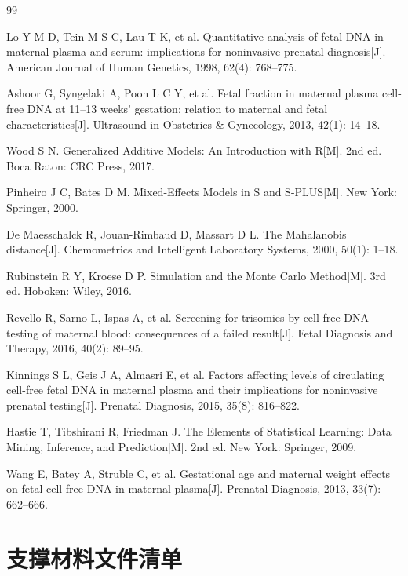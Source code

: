 \documentclass[withoutpreface]{cumcmthesis}
\begin{document}
\begin{thebibliography}{99}

Lo Y M D, Tein M S C, Lau T K, et al. Quantitative analysis of fetal DNA in maternal plasma and serum: implications for noninvasive prenatal diagnosis[J]. American Journal of Human Genetics, 1998, 62(4): 768--775.

Ashoor G, Syngelaki A, Poon L C Y, et al. Fetal fraction in maternal plasma cell-free DNA at 11--13 weeks' gestation: relation to maternal and fetal characteristics[J]. Ultrasound in Obstetrics \& Gynecology, 2013, 42(1): 14--18.

Wood S N. Generalized Additive Models: An Introduction with R[M]. 2nd ed. Boca Raton: CRC Press, 2017.

Pinheiro J C, Bates D M. Mixed-Effects Models in S and S-PLUS[M]. New York: Springer, 2000.

De Maesschalck R, Jouan-Rimbaud D, Massart D L. The Mahalanobis distance[J]. Chemometrics and Intelligent Laboratory Systems, 2000, 50(1): 1--18.

Rubinstein R Y, Kroese D P. Simulation and the Monte Carlo Method[M]. 3rd ed. Hoboken: Wiley, 2016.

Revello R, Sarno L, Ispas A, et al. Screening for trisomies by cell-free DNA testing of maternal blood: consequences of a failed result[J]. Fetal Diagnosis and Therapy, 2016, 40(2): 89--95.

Kinnings S L, Geis J A, Almasri E, et al. Factors affecting levels of circulating cell-free fetal DNA in maternal plasma and their implications for noninvasive prenatal testing[J]. Prenatal Diagnosis, 2015, 35(8): 816--822.

Hastie T, Tibshirani R, Friedman J. The Elements of Statistical Learning: Data Mining, Inference, and Prediction[M]. 2nd ed. New York: Springer, 2009.

Wang E, Batey A, Struble C, et al. Gestational age and maternal weight effects on fetal cell-free DNA in maternal plasma[J]. Prenatal Diagnosis, 2013, 33(7): 662--666.

\end{thebibliography}

\newpage
\appendix
\section{支撑材料文件清单}
\end{document}
